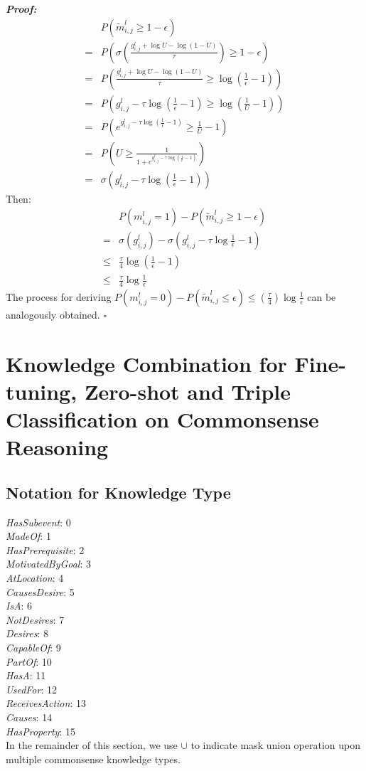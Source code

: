 \documentclass[11pt,a4paper]{article}
\begin{document}
\noindent
\textit{\textbf{Proof:}}
\begin{align}
	&P(\tilde{m}_{i,j}^l\geq 1-\epsilon) \\
	=&P(\sigma(\frac{g_{i,j}^l+\log{U}-\log{(1-U)}}{\tau}) \geq 1-\epsilon)\\
	=&P(\frac{g_{i,j}^l+\log{U}-\log{(1-U)}}{\tau} \geq \log{(\frac{1}{\epsilon}-1)}) \\
	=&P(g_{i,j}^l-\tau \log{(\frac{1}{\epsilon}-1)}\geq \log{(\frac{1}{U}-1)})\\
	=&P(e^{g_{i,j}^l-\tau \log{(\frac{1}{\epsilon}-1)}} \geq \frac{1}{U}-1)\\
	=&P(U\geq \frac{1}{1+e^{g_{i,j}^l-\tau \log{(\frac{1}{\epsilon}-1)}}})\\
	=&\sigma(g_{i,j}^l-\tau \log{(\frac{1}{\epsilon}-1)})
\end{align}
Then:
\begin{align}
	&P(m_{i,j}^l=1) - P(\tilde{m}_{i,j}^l\geq 1-\epsilon)\\
	=&\sigma(g_{i,j}^l)-\sigma(g_{i,j}^l-\tau \log{\frac{1}{\epsilon}-1})\\
	\leq&\frac{\tau}{4} \log{(\frac{1}{\epsilon}-1)} \\
	\leq&\frac{\tau}{4} \log{\frac{1}{\epsilon}}
\end{align}
The process for deriving $P(m_{i,j}^l=0) - P(\tilde{m}_{i,j}^l\leq \epsilon) \leq (\frac{\tau}{4})\log{\frac{1}{\epsilon}}$ can be analogously obtained.
$\square$

\section{Knowledge Combination for Fine-tuning, Zero-shot and Triple Classification on Commonsense Reasoning}
\subsection{Notation for Knowledge Type}
\textit{HasSubevent}: 0\\
\textit{MadeOf}: 1\\
\textit{HasPrerequisite}: 2\\
\textit{MotivatedByGoal}: 3\\
\textit{AtLocation}: 4\\
\textit{CausesDesire}: 5\\
\textit{IsA}: 6\\
\textit{NotDesires}: 7\\
\textit{Desires}: 8\\
\textit{CapableOf}: 9\\
\textit{PartOf}: 10\\
\textit{HasA}: 11\\
\textit{UsedFor}: 12\\
\textit{ReceivesAction}: 13\\
\textit{Causes}: 14\\
\textit{HasProperty}: 15\\
In the remainder of this section, we use $\cup$ to indicate mask union operation upon multiple commonsense knowledge types.
\end{document}
